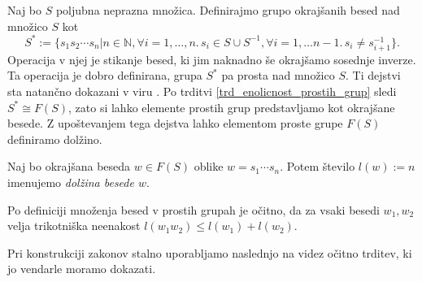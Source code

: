 Naj bo $S$ poljubna neprazna množica. Definirajmo grupo okrajšanih besed nad množico $S$ kot \begin{equation*}
    S^* := \{ s_1 s_2 \cdots s_n  \vert n \in \mathbb{N}, \forall i = 1, \ldots, n.\,  s_i \in S \cup S^{-1} , \forall i = 1 , \ldots n-1 .\, s_i \neq s_{i + 1}^{-1} \}.
\end{equation*}
Operacija v njej je stikanje besed, ki jim naknadno še okrajšamo sosednje inverze. Ta operacija je dobro definirana, grupa $S^*$ pa prosta nad množico $S$. 
Ti dejstvi sta natančno dokazani v viru \cite[str.~4, trditev 1.9]{Lyndon_Schupp_2015}. Po trditvi \ref{trd_enolicnost_prostih_grup} sledi $S^* \cong F(S)$,
zato si lahko elemente prostih grup predstavljamo kot okrajšane besede. Z upoštevanjem tega dejstva lahko elementom proste grupe $F(S)$ definiramo dolžino.

\begin{definicija}
\label{def_dolzina_besede}
Naj bo okrajšana beseda $w \in  F(S)$ oblike $w = s_1 \cdots s_n$. Potem število $l(w) := n$ imenujemo \emph{dolžina besede $w$}.
\end{definicija}
\begin{opomba}\label{opm_trikotniska_neenakost}
    Po definiciji množenja besed v prostih grupah je očitno, da za vsaki besedi $w_1 , w_2$ velja trikotniška neenakost $l(w_1 w_2) \le l(w_1) + l(w_2)$.
\end{opomba}

Pri konstrukciji zakonov stalno uporabljamo naslednjo na videz očitno trditev, ki jo vendarle moramo dokazati. 

